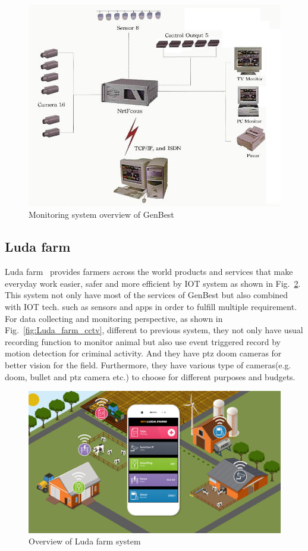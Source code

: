 \begin{figure}[H]
    \centering
    \includegraphics[width=\textwidth]{figsrc/genbest_system.jpeg}
    \caption{Monitoring system overview of GenBest\label{fig:genbest_system}}
\end{figure}

\subsection{Luda farm}
Luda farm~\cite{luda-farm} provides farmers across the world products and services that make everyday work easier, safer and more efficient by IOT system as shown in Fig.~\ref{fig:luda_overview}. This system not only have most of the services of GenBest but also combined with IOT tech. such as sensors and apps in order to fulfill multiple requirement. For data collecting and monitoring perspective, as shown in Fig.~\ref{fig:Luda_farm_cctv}, different to previous system, they not only have usual recording function to monitor animal but also use event triggered record by motion detection for criminal activity. And they have ptz doom cameras for better vision for the field. Furthermore, they have various type of cameras(e.g. doom, bullet and ptz camera etc.) to choose for different purposes and budgets.

\begin{figure}[H]
    \centering
    \includegraphics[width=\textwidth]{figsrc/luda_overview.png}
    \caption{Overview of Luda farm system\label{fig:luda_overview}}
\end{figure}

